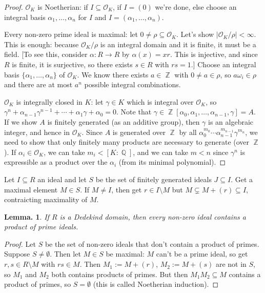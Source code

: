 \documentclass[11pt, a4paper]{memoir}
\DeclareMathOperator{\Q}{{\mathbb{Q}}}
\DeclareMathOperator{\Z}{{\mathbb{Z}}}
\theoremstyle{change}
\newtheorem{lemma}[theorem]{Lemma.}
\theoremstyle{plain}
\theoremstyle{nonumberplain}
\newtheorem{proof}{Proof}
\begin{document}
\begin{proof}
    $\mathcal{O}_K$ is Noetherian: if $I\subseteq\mathcal{O}_K$, if $I=(0)$ we're done, else choose an integral basis $\alpha_1,\ldots,\alpha_n$ for $I$ and $I=(\alpha_1,\ldots,\alpha_n)$.

    Every non-zero prime ideal is maximal: let $0\neq \rho\subseteq\mathcal{O}_K$.
    Let's show $|\mathcal{O}_K/\rho|<\infty$.
    This is enough: because $\mathcal{O}_K/\rho$ is an integral domain and it is finite, it must be a field.
    [To see this, consider $\alpha:R\to R$ by $\alpha(x)=xr$.
    This is injective, and since $R$ is finite, it is surjective, so there exists $s\in R$ with $rs=1$.]
    Choose an integral basis $\{\alpha_1,\ldots,\alpha_n\}$ of $\mathcal{O}_K$.
    We know there exists $a\in\Z$ with $0\neq a\in\rho$, so $a\omega_i\in\rho$ and there are at most $a^n$ possible integral combinations.

    $\mathcal{O}_K$ is integrally closed in $K$: let $\gamma\in K$ which is integral over $\mathcal{O}_K$, so $\gamma^n+\alpha_{n-1}\gamma^{n-1}+\cdots+\alpha_1\gamma+\alpha_0=0$.
    Note that $\gamma\in\Z[\alpha_0,\alpha_1,\ldots,\alpha_{n-1},\gamma]=A$.
    If we show $A$ is finitely generated (as an additive group), then $\gamma$ is an algebraic integer, and hence in $\mathcal{O}_K$.
    Since $A$ is generated over $\Z$ by all $\alpha_0^{m_0}\cdots\alpha_{n-1}^{m_{n-1}}\gamma^{m_n}$, we need to show that only finitely many products are necessary to generate (over $\Z$).
    If $\alpha_i\in\mathcal{O}_K$, we can take $m_i<[K:\Q]$, and we can take $m<n$ since $\gamma^n$ is expressible as a product over the $\alpha_i$ (from its minimal polynomial).
\end{proof}
Let $I\subseteq R$ an ideal and let $S$ be the set of finitely generated ideals $J\subseteq I$.
Get a maximal element $M\in S$.
If $M\neq I$, then get $r\in I\setminus M$ but $M\subsetneq M+(r)\subseteq I$, contraicting maximality of $M$.
\begin{lemma}
    If $R$ is a Dedekind domain, then every non-zero ideal contains a product of prime ideals.
\end{lemma}
\begin{proof}
    Let $S$ be the set of non-zero ideals that don't contain a product of primes.
    Suppose $S\neq\emptyset$.
    Then let $M\in S$ be maximal: $M$ can't be a prime ideal, so get $r,s\in R\setminus M$ with $rs\in M$.
    Then $M_1:=M+(r)$, $M_2:=M+(s)$ are not in $S$, so $M_1$ and $M_2$ both contains products of primes.
    But then $M_1M_2\subseteq M$ contains a product of primes, so $S=\emptyset$ (this is called Noetherian induction).
\end{proof}
\end{document}
